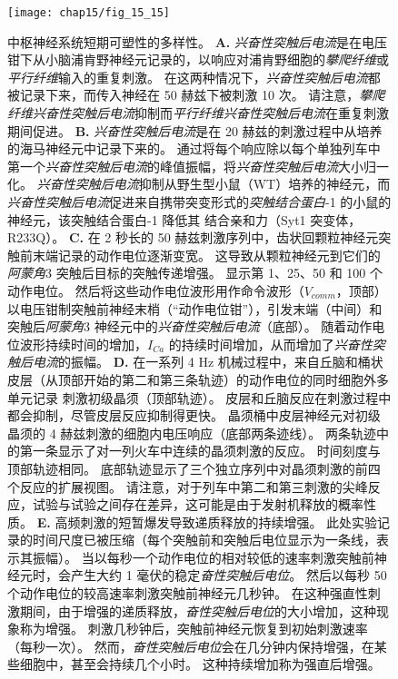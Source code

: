 \begin{figure}[htbp]
	\centering
	\texttt{[image: chap15/fig\_15\_15]}
	\caption{中枢神经系统短期可塑性的多样性。
		\textbf{A.} \textit{兴奋性突触后电流}是在电压钳下从小脑浦肯野神经元记录的，以响应对浦肯野细胞的\textit{攀爬纤维}或\textit{平行纤维}输入的重复刺激。
		在这两种情况下，\textit{兴奋性突触后电流}都被记录下来，而传入神经在 50 赫兹下被刺激 10 次。
		请注意，\textit{攀爬纤维}\textit{兴奋性突触后电流}抑制而\textit{平行纤维}\textit{兴奋性突触后电流}在重复刺激期间促进\cite{dittman2000interplay}。
		\textbf{B.} \textit{兴奋性突触后电流}是在 20 赫兹的刺激过程中从培养的海马神经元中记录下来的。
		通过将每个响应除以每个单独列车中第一个\textit{兴奋性突触后电流}的峰值振幅，将\textit{兴奋性突触后电流}大小归一化。
		\textit{兴奋性突触后电流}抑制从野生型小鼠（WT）培养的神经元，而\textit{兴奋性突触后电流}促进来自携带突变形式的\textit{突触结合蛋白}-1 的小鼠的神经元，该突触结合蛋白-1 降低其  结合亲和力（Syt1 突变体，R233Q）\cite{fernandez2001synaptotagmin}。
		\textbf{C.} 在 2 秒长的 50 赫兹刺激序列中，齿状回颗粒神经元突触前末端记录的动作电位逐渐变宽。
		这导致从颗粒神经元到它们的 \textit{阿蒙角}3 突触后目标的突触传递增强。
		显示第 1、25、50 和 100 个动作电位。
		然后将这些动作电位波形用作命令波形（$V_{comm}$，顶部）以电压钳制突触前神经末梢（“动作电位钳”），引发末端（中间）和 突触后\textit{阿蒙角}3 神经元中的\textit{兴奋性突触后电流}（底部）。
		随着动作电位波形持续时间的增加，$I_{Ca}$ 的持续时间增加，从而增加了\textit{兴奋性突触后电流}的振幅\cite{geiger2000dynamic}。
		\textbf{D.} 在一系列 4 Hz 机械过程中，来自丘脑和桶状皮层（从顶部开始的第二和第三条轨迹）的动作电位的同时细胞外多单元记录 刺激初级晶须（顶部轨迹）。
		皮层和丘脑反应在刺激过程中都会抑制，尽管皮层反应抑制得更快。
		晶须桶中皮层神经元对初级晶须的 4 赫兹刺激的细胞内电压响应（底部两条迹线）。
		两条轨迹中的第一条显示了对一列火车中连续的晶须刺激的反应。
		时间刻度与顶部轨迹相同。
		底部轨迹显示了三个独立序列中对晶须刺激的前四个反应的扩展视图。
		请注意，对于列车中第二和第三刺激的尖峰反应，试验与试验之间存在差异，这可能是由于发射机释放的概率性质\cite{chung2002short}。
		\textbf{E.} 高频刺激的短暂爆发导致递质释放的持续增强。
		此处实验记录的时间尺度已被压缩（每个突触前和突触后电位显示为一条线，表示其振幅）。
		当以每秒一个动作电位的相对较低的速率刺激突触前神经元时，会产生大约 1 毫伏的稳定\textit{奋性突触后电位}。
		然后以每秒 50 个动作电位的较高速率刺激突触前神经元几秒钟。
		在这种强直性刺激期间，由于增强的递质释放，\textit{奋性突触后电位}的大小增加，这种现象称为增强。
		刺激几秒钟后，突触前神经元恢复到初始刺激速率（每秒一次）。
		然而，\textit{奋性突触后电位}会在几分钟内保持增强，在某些细胞中，甚至会持续几个小时。
		这种持续增加称为强直后增强。}
	\label{fig:15_15}
\end{figure}


